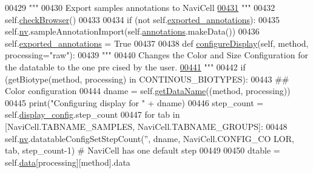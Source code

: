 \begin{DoxyCode}
00429         \textcolor{stringliteral}{"""}
00430 \textcolor{stringliteral}{        Export samples annotations to NaviCell}
\hypertarget{navicom_8py_source_l00431}{}\hyperlink{classnavicom_1_1navicom_1_1NaviCom_a5a59edead26b5d02f17a60df055576f5}{00431} \textcolor{stringliteral}{        """}
00432         self.\hyperlink{classnavicom_1_1navicom_1_1NaviCom_aa7aadc5d33a24f0fd5705e363c0fedcb}{checkBrowser}()
00433 
00434         \textcolor{keywordflow}{if} (\textcolor{keywordflow}{not} self.\hyperlink{classnavicom_1_1navicom_1_1NaviCom_aff54ed91d1f335cea31829f59d4efb81}{exported_annotations}):
00435             self.\hyperlink{classnavicom_1_1navicom_1_1NaviCom_af740fe52f9f3cfc076ae88ca696bd05e}{nv}.sampleAnnotationImport(self.\hyperlink{classnavicom_1_1navicom_1_1NaviCom_a0386d881214943cf3432d0ffe22cbb71}{annotations}.makeData())
00436             self.\hyperlink{classnavicom_1_1navicom_1_1NaviCom_aff54ed91d1f335cea31829f59d4efb81}{exported_annotations} = \textcolor{keyword}{True}
00437 
00438     \textcolor{keyword}{def }\hyperlink{classnavicom_1_1navicom_1_1NaviCom_a5b6fef64cb29988c7a4c07138c03b5c1}{configureDisplay}(self, method, processing="raw"):
00439         \textcolor{stringliteral}{"""}
00440 \textcolor{stringliteral}{        Changes the Color and Size Configuration for the datatable to the one pre
      cised by the user.}
\hypertarget{navicom_8py_source_l00441}{}\hyperlink{classnavicom_1_1navicom_1_1NaviCom_a5b6fef64cb29988c7a4c07138c03b5c1}{00441} \textcolor{stringliteral}{        """}
00442         \textcolor{keywordflow}{if} (getBiotype(method, processing) \textcolor{keywordflow}{in} CONTINOUS\_BIOTYPES):
00443             \textcolor{comment}{## Color configuration}
00444             dname = self.\hyperlink{classnavicom_1_1navicom_1_1NaviCom_a51ecb41beebc7636bde73be2e1ffc407}{getDataName}((method, processing))
00445             \textcolor{keywordflow}{print}(\textcolor{stringliteral}{"Configuring display for "} + dname)
00446             step\_count = self.\hyperlink{classnavicom_1_1navicom_1_1NaviCom_a56628d774db59cb8b06af3801fb6306c}{display_config}.step\_count
00447             \textcolor{keywordflow}{for} tab \textcolor{keywordflow}{in} [NaviCell.TABNAME\_SAMPLES, NaviCell.TABNAME\_GROUPS]:
00448                 self.\hyperlink{classnavicom_1_1navicom_1_1NaviCom_af740fe52f9f3cfc076ae88ca696bd05e}{nv}.datatableConfigSetStepCount(\textcolor{stringliteral}{''}, dname, NaviCell.CONFIG\_CO
      LOR, tab, step\_count-1) \textcolor{comment}{# NaviCell has one default step}
00449 
00450             dtable = self.\hyperlink{classnavicom_1_1navicom_1_1NaviCom_aa1abff245573ed8406c6bddb4596f093}{data}[processing][method].data

\end{DoxyCode}
